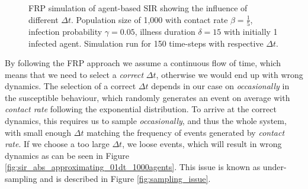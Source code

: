 \begin{figure}
\begin{center}
	\caption{FRP simulation of agent-based SIR showing the influence of different $\Delta t$. Population size of 1,000 with contact rate $\beta = \frac{1}{5}$, infection probability $\gamma = 0.05$, illness duration $\delta = 15$ with initially 1 infected agent. Simulation run for 150 time-steps with respective $\Delta t$.} 
	\label{fig:sir_abs_dynamics_frp}
\end{center}
\end{figure}

By following the FRP approach we assume a continuous flow of time, which means that we need to select a \textit{correct} $\Delta t$, otherwise we would end up with wrong dynamics. The selection of a correct $\Delta t$ depends in our case on \textit{occasionally} in the susceptible behaviour, which randomly generates an event on average with \textit{contact rate} following the exponential distribution. To arrive at the correct dynamics, this requires us to sample \textit{occasionally}, and thus the whole system, with small enough $\Delta t$ matching the frequency of events generated by \textit{contact rate}. If we choose a too large $\Delta t$, we loose events, which will result in wrong dynamics as can be seen in Figure \ref{fig:sir_abs_approximating_01dt_1000agents}. This issue is known as under-sampling and is described in Figure \ref{fig:sampling_issue}.

